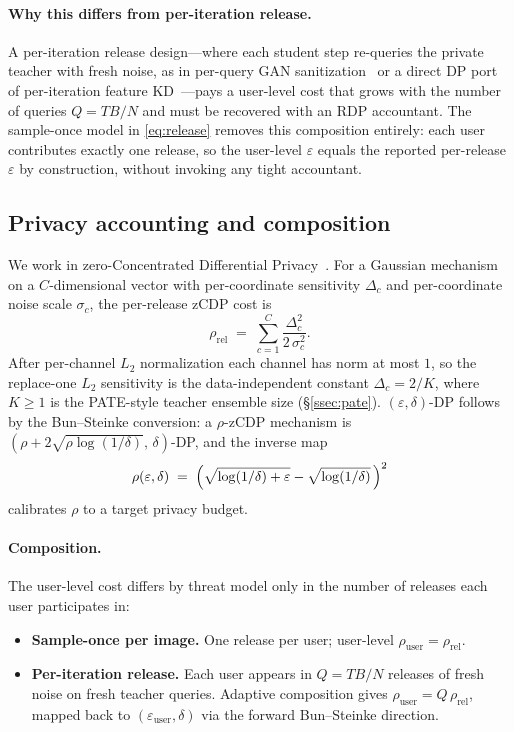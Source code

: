 \paragraph{Why this differs from per-iteration release.}
A per-iteration release design---where each student step re-queries
the private teacher with fresh noise, as in per-query GAN
sanitization~\cite{gao2020pkdgan} or a direct DP port of per-iteration
feature KD~\cite{lan2024gkd}---pays a user-level cost that grows with
the number of queries $Q=TB/N$ and must be recovered with an RDP
accountant. The sample-once model in \eqref{eq:release} removes this
composition entirely: each user contributes exactly one release, so
the user-level $\varepsilon$ equals the reported per-release
$\varepsilon$ by construction, without invoking any tight accountant.

\subsection{Privacy accounting and composition}
\label{ssec:accounting}

We work in zero-Concentrated Differential
Privacy~\cite{bun2016concentrated}. For a Gaussian mechanism on a
$C$-dimensional vector with per-coordinate sensitivity $\Delta_c$ and
per-coordinate noise scale $\sigma_c$, the per-release zCDP cost is
\begin{equation}
\rho_{\mathrm{rel}}
 \;=\; \sum_{c=1}^{C}\frac{\Delta_c^2}{2\,\sigma_c^2}.
\label{eq:rho-rel}
\end{equation}
After per-channel $L_2$ normalization each channel has norm at most
$1$, so the replace-one $L_2$ sensitivity is the data-independent
constant $\Delta_c = 2/K$, where $K\geq 1$ is the PATE-style teacher
ensemble size (\S\ref{ssec:pate}). $(\varepsilon,\delta)$-DP follows by
the Bun--Steinke conversion: a $\rho$-zCDP mechanism is
$(\rho + 2\sqrt{\rho\log(1/\delta)},\,\delta)$-DP, and the inverse map
\begin{equation}
\rho(\varepsilon,\delta)
 \;=\;\Bigl(\sqrt{\log(1/\delta)+\varepsilon}-\sqrt{\log(1/\delta)}\,\Bigr)^{2}
\label{eq:eps-to-rho}
\end{equation}
calibrates $\rho$ to a target privacy budget.

\paragraph{Composition.}
The user-level cost differs by threat model only in the number of
releases each user participates in:
\begin{itemize}
\item \textbf{Sample-once per image.} One release per user; user-level
$\rho_{\mathrm{user}} = \rho_{\mathrm{rel}}$.
\item \textbf{Per-iteration release.} Each user appears in
$Q = TB/N$ releases of fresh noise on fresh teacher queries. Adaptive
composition gives $\rho_{\mathrm{user}} = Q\,\rho_{\mathrm{rel}}$,
mapped back to $(\varepsilon_{\mathrm{user}}, \delta)$ via the forward
Bun--Steinke direction.
\end{itemize}

